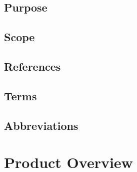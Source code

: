 \documentclass{scrreprt}
\begin{document}
\section{Purpose}

\section{Scope}

\section{References}

\section{Terms}

\section{Abbreviations}


\chapter{Product Overview}
\end{document}
